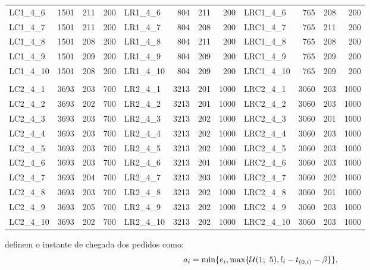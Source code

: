 \begin{footnotesize}
\begin{center}
\begin{longtable}{lrrr|lrrr|lrrr}
        LC1\_4\_6  & 1501 & 211 & 200 & LR1\_4\_6  &  804 & 211 &  200 & LRC1\_4\_6  &  765 & 208 &  200\\
        LC1\_4\_7  & 1501 & 211 & 200 & LR1\_4\_7  &  804 & 208 &  200 & LRC1\_4\_7  &  765 & 211 &  200\\
        LC1\_4\_8  & 1501 & 208 & 200 & LR1\_4\_8  &  804 & 211 &  200 & LRC1\_4\_8  &  765 & 208 &  200\\
        LC1\_4\_9  & 1501 & 209 & 200 & LR1\_4\_9  &  804 & 209 &  200 & LRC1\_4\_9  &  765 & 209 &  200\\
        LC1\_4\_10 & 1501 & 208 & 200 & LR1\_4\_10 &  804 & 209 &  200 & LRC1\_4\_10 &  765 & 209 &  200\\
                   &      &     &     &            &      &     &      &             &      &     &     \\
        LC2\_4\_1  & 3693 & 203 & 700 & LR2\_4\_1  & 3213 & 201 & 1000 & LRC2\_4\_1  & 3060 & 203 & 1000\\
        LC2\_4\_2  & 3693 & 202 & 700 & LR2\_4\_2  & 3213 & 201 & 1000 & LRC2\_4\_2  & 3060 & 203 & 1000\\
        LC2\_4\_3  & 3693 & 203 & 700 & LR2\_4\_3  & 3213 & 202 & 1000 & LRC2\_4\_3  & 3060 & 201 & 1000\\
        LC2\_4\_4  & 3693 & 203 & 700 & LR2\_4\_4  & 3213 & 202 & 1000 & LRC2\_4\_4  & 3060 & 203 & 1000\\
        LC2\_4\_5  & 3693 & 203 & 700 & LR2\_4\_5  & 3213 & 202 & 1000 & LRC2\_4\_5  & 3060 & 203 & 1000\\
        LC2\_4\_6  & 3693 & 203 & 700 & LR2\_4\_6  & 3213 & 201 & 1000 & LRC2\_4\_6  & 3060 & 203 & 1000\\
        LC2\_4\_7  & 3693 & 204 & 700 & LR2\_4\_7  & 3213 & 203 & 1000 & LRC2\_4\_7  & 3060 & 202 & 1000\\
        LC2\_4\_8  & 3693 & 203 & 700 & LR2\_4\_8  & 3213 & 202 & 1000 & LRC2\_4\_8  & 3060 & 201 & 1000\\
        LC2\_4\_9  & 3693 & 205 & 700 & LR2\_4\_9  & 3213 & 202 & 1000 & LRC2\_4\_9  & 3060 & 203 & 1000\\
        LC2\_4\_10 & 3693 & 202 & 700 & LR2\_4\_10 & 3213 & 202 & 1000 & LRC2\_4\_10 & 3060 & 203 & 1000\\
    \hline
\end{longtable}
\end{center}
\end{footnotesize}

\textcite{pureza_laporte_waiting_2008} definem o instante de chegada dos
pedidos como:
%
\begin{equation}
    a_{i} = \min\{e_i,
    \max\{\mathcal{U}(1;\ 5), l_i -
    t_{(0,i)} - \beta\}\},
  \label{eq:pureza_waiting_2008_requestArrivalTime}
\end{equation}

